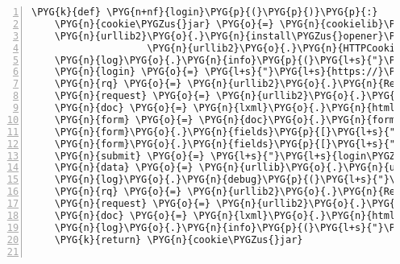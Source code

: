 \begin{Verbatim}[commandchars=\\\{\},numbers=left,firstnumber=1,stepnumber=5]
\PYG{k}{def} \PYG{n+nf}{login}\PYG{p}{(}\PYG{p}{)}\PYG{p}{:}
    \PYG{n}{cookie\PYGZus{}jar} \PYG{o}{=} \PYG{n}{cookielib}\PYG{o}{.}\PYG{n}{CookieJar}\PYG{p}{(}\PYG{p}{)}
    \PYG{n}{urllib2}\PYG{o}{.}\PYG{n}{install\PYGZus{}opener}\PYG{p}{(}\PYG{n}{urllib2}\PYG{o}{.}\PYG{n}{build\PYGZus{}opener}\PYG{p}{(}
                    \PYG{n}{urllib2}\PYG{o}{.}\PYG{n}{HTTPCookieProcessor}\PYG{p}{(}\PYG{n}{cookie\PYGZus{}jar}\PYG{p}{)}\PYG{p}{)}\PYG{p}{)}
    \PYG{n}{log}\PYG{o}{.}\PYG{n}{info}\PYG{p}{(}\PYG{l+s}{"}\PYG{l+s}{Loggin in to galaxy server }\PYG{l+s+si}{\PYGZpc{}s}\PYG{l+s}{ ...}\PYG{l+s}{"} \PYG{o}{\PYGZpc{}} \PYG{n}{hostname}\PYG{p}{)}
    \PYG{n}{login} \PYG{o}{=} \PYG{l+s}{"}\PYG{l+s}{https://}\PYG{l+s}{"} \PYG{o}{+} \PYG{n}{hostname} \PYG{o}{+} \PYG{l+s}{"}\PYG{l+s}{/user/login}\PYG{l+s}{"}
    \PYG{n}{rq} \PYG{o}{=} \PYG{n}{urllib2}\PYG{o}{.}\PYG{n}{Request}\PYG{p}{(}\PYG{n}{login}\PYG{p}{,} \PYG{n}{headers}\PYG{o}{=}\PYG{n}{rq\PYGZus{}headers}\PYG{p}{)}
    \PYG{n}{request} \PYG{o}{=} \PYG{n}{urllib2}\PYG{o}{.}\PYG{n}{urlopen}\PYG{p}{(}\PYG{n}{rq}\PYG{p}{)}
    \PYG{n}{doc} \PYG{o}{=} \PYG{n}{lxml}\PYG{o}{.}\PYG{n}{html}\PYG{o}{.}\PYG{n}{parse}\PYG{p}{(}\PYG{n}{request}\PYG{p}{)}\PYG{o}{.}\PYG{n}{getroot}\PYG{p}{(}\PYG{p}{)}
    \PYG{n}{form} \PYG{o}{=} \PYG{n}{doc}\PYG{o}{.}\PYG{n}{forms}\PYG{p}{[}\PYG{l+m+mi}{0}\PYG{p}{]}
    \PYG{n}{form}\PYG{o}{.}\PYG{n}{fields}\PYG{p}{[}\PYG{l+s}{"}\PYG{l+s}{email}\PYG{l+s}{"}\PYG{p}{]} \PYG{o}{=} \PYG{n}{email}
    \PYG{n}{form}\PYG{o}{.}\PYG{n}{fields}\PYG{p}{[}\PYG{l+s}{"}\PYG{l+s}{password}\PYG{l+s}{"}\PYG{p}{]} \PYG{o}{=} \PYG{n}{password}
    \PYG{n}{submit} \PYG{o}{=} \PYG{l+s}{"}\PYG{l+s}{login\PYGZus{}button}\PYG{l+s}{"}\PYG{p}{,} \PYG{n}{form}\PYG{o}{.}\PYG{n}{fields}\PYG{p}{[}\PYG{l+s}{"}\PYG{l+s}{login\PYGZus{}button}\PYG{l+s}{"}\PYG{p}{]}
    \PYG{n}{data} \PYG{o}{=} \PYG{n}{urllib}\PYG{o}{.}\PYG{n}{urlencode}\PYG{p}{(}\PYG{n}{form}\PYG{o}{.}\PYG{n}{form\PYGZus{}values}\PYG{p}{(}\PYG{p}{)} \PYG{o}{+} \PYG{p}{[}\PYG{n}{submit}\PYG{p}{]}\PYG{p}{)}
    \PYG{n}{log}\PYG{o}{.}\PYG{n}{debug}\PYG{p}{(}\PYG{l+s}{"}\PYG{l+s}{posting login form: }\PYG{l+s+si}{\PYGZpc{}s}\PYG{l+s}{"} \PYG{o}{\PYGZpc{}} \PYG{n}{form}\PYG{o}{.}\PYG{n}{action}\PYG{p}{)}
    \PYG{n}{rq} \PYG{o}{=} \PYG{n}{urllib2}\PYG{o}{.}\PYG{n}{Request}\PYG{p}{(}\PYG{n}{form}\PYG{o}{.}\PYG{n}{action}\PYG{p}{,} \PYG{n}{headers}\PYG{o}{=}\PYG{n}{rq\PYGZus{}headers}\PYG{p}{)}
    \PYG{n}{request} \PYG{o}{=} \PYG{n}{urllib2}\PYG{o}{.}\PYG{n}{urlopen}\PYG{p}{(}\PYG{n}{rq}\PYG{p}{,} \PYG{n}{data}\PYG{p}{)}
    \PYG{n}{doc} \PYG{o}{=} \PYG{n}{lxml}\PYG{o}{.}\PYG{n}{html}\PYG{o}{.}\PYG{n}{parse}\PYG{p}{(}\PYG{n}{request}\PYG{p}{)}\PYG{o}{.}\PYG{n}{getroot}\PYG{p}{(}\PYG{p}{)}
    \PYG{n}{log}\PYG{o}{.}\PYG{n}{info}\PYG{p}{(}\PYG{l+s}{"}\PYG{l+s}{Success!}\PYG{l+s}{"}\PYG{p}{)}
    \PYG{k}{return} \PYG{n}{cookie\PYGZus{}jar}


\end{Verbatim}
